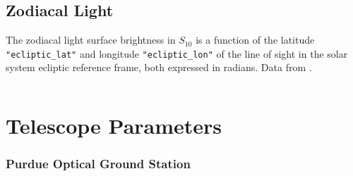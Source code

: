 \begin{listing}[H]
\inputminted[breaklines=true, breakanywhere=true, breaksymbol=\hspace{0pt}, fontsize=\footnotesize]{json}{/Users/liamrobinson/Documents/PyLightCurves/mirage/resources/data/moonlight.json}
\end{listing}

\clearpage
\subsection{Zodiacal Light} \label{data:roach_zod}

The zodiacal light surface brightness in $S_10$ is a function of the latitude \texttt{"ecliptic\_lat"} and longitude \texttt{"ecliptic\_lon"} of the line of sight in the solar system ecliptic reference frame, both expressed in radians. Data from \cite{roach1972}.

\begin{listing}[H]
\inputminted[breaklines=true, breakanywhere=true, breaksymbol=\hspace{0pt}, fontsize=\footnotesize]{json}{/Users/liamrobinson/Documents/PyLightCurves/mirage/resources/data/zodiacal.json}
\end{listing}

\clearpage
\section{Telescope Parameters}

\subsubsection{Purdue Optical Ground Station}

